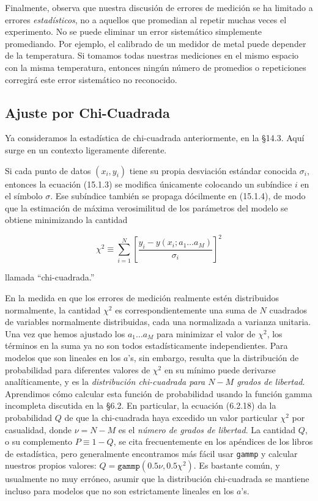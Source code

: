 \documentclass[10pt,a4paper]{book}
\begin{document}
Finalmente, observa que nuestra discusión de errores de medición se ha limitado a errores \textit{estadísticos}, no a aquellos que promedian al repetir muchas veces el experimento. No se puede eliminar un error sistemático simplemente promediando. Por ejemplo, el calibrado de un medidor de metal puede depender de la temperatura. Si tomamos todas nuestras mediciones en el mismo espacio con la misma temperatura, entonces ningún número de promedios o repeticiones corregirá este error sistemático no reconocido.

\subsection{Ajuste por Chi-Cuadrada}

Ya consideramos la estadística de chi-cuadrada anteriormente, en la §14.3. Aquí surge en un contexto ligeramente diferente.

Si cada punto de datos $(x_i, y_i)$ tiene su propia desviación estándar conocida $\sigma_i$, entonces la ecuación (15.1.3) se modifica únicamente colocando un subíndice $i$ en el símbolo $\sigma$. Ese subíndice también se propaga dócilmente en (15.1.4), de modo que la estimación de máxima verosimilitud de los parámetros del modelo se obtiene minimizando la cantidad

\begin{equation}
\chi^2 \equiv \sum_{i=1}^{N} \left[ \frac{y_i - y(x_i; a_1 \ldots a_M)}{\sigma_i} \right]^2
\tag{15.1.5}
\end{equation}

llamada “chi-cuadrada.”

En la medida en que los errores de medición realmente estén distribuidos normalmente, la cantidad $\chi^2$ es correspondientemente una suma de $N$ cuadrados de variables normalmente distribuidas, cada una normalizada a varianza unitaria. Una vez que hemos ajustado los $a_1 \ldots a_M$ para minimizar el valor de $\chi^2$, los términos en la suma ya no son todos estadísticamente independientes. Para modelos que son lineales en los $a$’s, sin embargo, resulta que la distribución de probabilidad para diferentes valores de $\chi^2$ en su mínimo puede derivarse analíticamente, y es la \textit{distribución chi-cuadrada para $N - M$ grados de libertad}. Aprendimos cómo calcular esta función de probabilidad usando la función gamma incompleta discutida en la §6.2. En particular, la ecuación (6.2.18) da la probabilidad $Q$ de que la chi-cuadrada haya excedido un valor particular $\chi^2$ por casualidad, donde $\nu = N - M$ es el \textit{número de grados de libertad}. La cantidad $Q$, o su complemento $P \equiv 1 - Q$, se cita frecuentemente en los apéndices de los libros de estadística, pero generalmente encontramos más fácil usar \texttt{gammp} y calcular nuestros propios valores: $Q = \texttt{gammp}(0.5\nu, 0.5\chi^2)$. Es bastante común, y usualmente no muy erróneo, asumir que la distribución chi-cuadrada se mantiene incluso para modelos que no son estrictamente lineales en los $a$’s.
\end{document}
